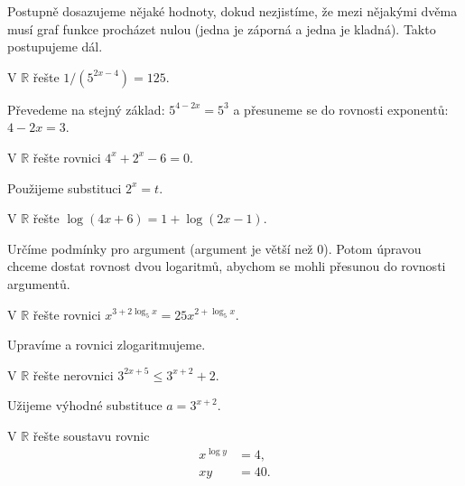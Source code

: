 \begin{reseni}
Postupně dosazujeme nějaké hodnoty, dokud nezjistíme, že mezi nějakými dvěma
musí graf funkce procházet nulou (jedna je záporná a jedna je kladná). Takto postupujeme
dál.
\end{reseni}

\begin{priklad}
V $\mathbb R$ řešte $1/(5^{2x-4})=125.$
\end{priklad}

\begin{reseni}
Převedeme na stejný základ: $5^{4-2x}=5^3$ a přesuneme se do rovnosti exponentů:
$4-2x=3$.
\end{reseni}

\begin{priklad}
V $\mathbb R$ řešte rovnici $4^x+2^x-6=0$.
\end{priklad}

\begin{reseni}
Použijeme substituci $2^x=t.$
\end{reseni}

\begin{priklad}
V $\mathbb R$ řešte $\log (4x+6)=1+\log(2x-1).$
\end{priklad}

\begin{reseni}
Určíme podmínky pro argument (argument je větší než 0). Potom úpravou chceme dostat
rovnost dvou logaritmů, abychom se mohli přesunou do rovnosti argumentů.
\end{reseni}

\begin{priklad}
V $\mathbb R$ řešte rovnici $x^{3+2\log_5 x}=25x^{2+\log_5 x}$.
\end{priklad}

\begin{reseni}
Upravíme a rovnici zlogaritmujeme.
\end{reseni}

\begin{priklad}
V $\mathbb R$ řešte nerovnici $3^{2x+5}\leq 3^{x+2}+2.$
\end{priklad}

\begin{reseni}
Užijeme výhodné substituce $a=3^{x+2}$.
\end{reseni}

\begin{priklad}
V $\mathbb R$ řešte soustavu rovnic
\begin{align*}
    x^{\log y} &= 4,\\
    xy &= 40.
\end{align*}
\end{priklad}

